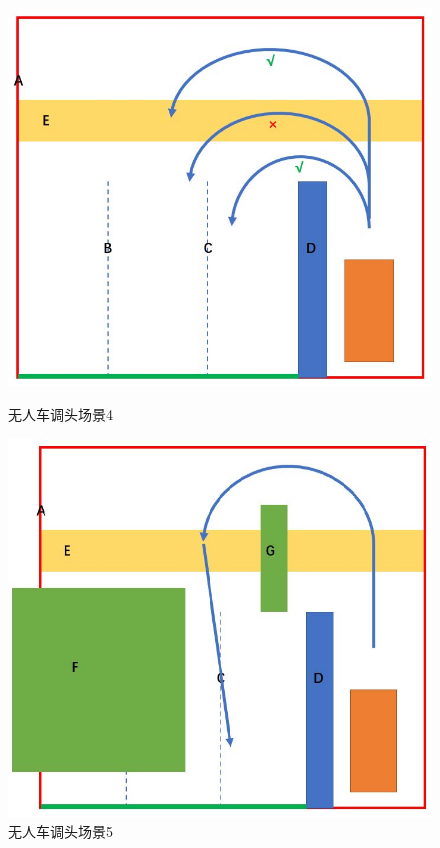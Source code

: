 \documentclass{article}
\begin{document}
\vspace{0.5ex}
\begin{figure}[hbt]
    \begin{minipage}[t]{0.5\textwidth}
        \centering
        \includegraphics[scale=0.8]{4.jpg}
        \caption{无人车调头场景4}
    \end{minipage}
    \qquad
    \begin{minipage}[t]{0.5\textwidth}
        \centering
        \includegraphics[scale=0.8]{5.jpg}
        \caption{无人车调头场景5}
    \end{minipage}
\end{figure}
\vspace{0.5ex}
\end{document}
